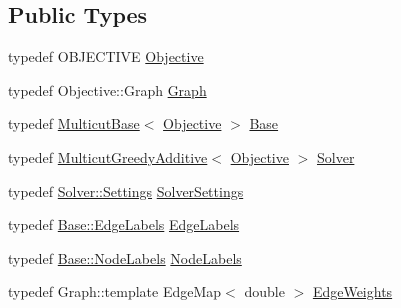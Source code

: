 \subsection*{Public Types}
\begin{DoxyCompactItemize}
\item 
typedef O\+B\+J\+E\+C\+T\+I\+V\+E \hyperlink{classnifty_1_1graph_1_1WatershedProposals_a6c8b1e69ffce69a32dc4a1a5fdd8b455}{Objective}
\item 
typedef Objective\+::\+Graph \hyperlink{classnifty_1_1graph_1_1WatershedProposals_ac1b4debb35285dc3e993460a4d579ebb}{Graph}
\item 
typedef \hyperlink{classnifty_1_1graph_1_1MulticutBase}{Multicut\+Base}$<$ \hyperlink{classnifty_1_1graph_1_1WatershedProposals_a6c8b1e69ffce69a32dc4a1a5fdd8b455}{Objective} $>$ \hyperlink{classnifty_1_1graph_1_1WatershedProposals_addfa29bbb1e705c4ea5eed5b700ec6ac}{Base}
\item 
typedef \hyperlink{classnifty_1_1graph_1_1MulticutGreedyAdditive}{Multicut\+Greedy\+Additive}$<$ \hyperlink{classnifty_1_1graph_1_1WatershedProposals_a6c8b1e69ffce69a32dc4a1a5fdd8b455}{Objective} $>$ \hyperlink{classnifty_1_1graph_1_1WatershedProposals_a2a9b608a2398e725e2b8e6dd79916069}{Solver}
\item 
typedef \hyperlink{classnifty_1_1graph_1_1MulticutGreedyAdditive_ab14192647e24d574c75538087acfd090}{Solver\+::\+Settings} \hyperlink{classnifty_1_1graph_1_1WatershedProposals_ad16d7c31eb54158ffc0e637b604f7126}{Solver\+Settings}
\item 
typedef \hyperlink{classnifty_1_1graph_1_1MulticutBase_aaeefe3c5df81d9c9efffec878cf2fcd7}{Base\+::\+Edge\+Labels} \hyperlink{classnifty_1_1graph_1_1WatershedProposals_a193558ab36f22b02bd769212a3369304}{Edge\+Labels}
\item 
typedef \hyperlink{classnifty_1_1graph_1_1MulticutBase_afba61ad2919d0fad20b3745af19309da}{Base\+::\+Node\+Labels} \hyperlink{classnifty_1_1graph_1_1WatershedProposals_aaf3781be9f0ca924072375a681149673}{Node\+Labels}
\item 
typedef Graph\+::template Edge\+Map$<$ double $>$ \hyperlink{classnifty_1_1graph_1_1WatershedProposals_adfde03fd0d46304ec23018bde36cfe87}{Edge\+Weights}
\end{DoxyCompactItemize}
